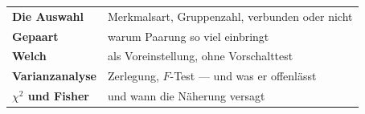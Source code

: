 \begin{merksatz}
\begin{center}
\renewcommand{\arraystretch}{1.5}
\begin{tabular}{@{}P{3.0cm}P{5.6cm}@{}}
\toprule
\textbf{Die Auswahl} & Merkmalsart, Gruppenzahl, verbunden oder nicht\\
\textbf{Gepaart} & warum Paarung so viel einbringt\\
\textbf{Welch} & als Voreinstellung, ohne Vorschalttest\\
\textbf{Varianzanalyse} & Zerlegung, $F$-Test --- und was er offenlässt\\
\textbf{$\chi^2$ und Fisher} & und wann die Näherung versagt\\
\bottomrule
\end{tabular}
\end{center}

\begin{center}
\begin{minipage}{0.88\textwidth}
\end{minipage}
\end{center}
\end{merksatz}
